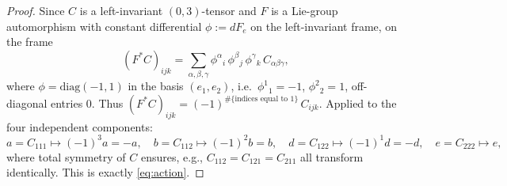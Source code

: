\documentclass{amsart}
\theoremstyle{definition}
\theoremstyle{remark}
\begin{document}
\begin{proof}
Since $C$ is a left-invariant $(0,3)$-tensor and $F$ is a Lie-group automorphism with constant differential
$\phi:=dF_e$ on the left-invariant frame, on the frame
\[
(F^{*}C)_{ijk}=\sum_{\alpha,\beta,\gamma}\phi^{\alpha}{}_{i}\,\phi^{\beta}{}_{j}\,\phi^{\gamma}{}_{k}\,C_{\alpha\beta\gamma},
\]
where $\phi=\mathrm{diag}(-1,1)$ in the basis $(e_1,e_2)$, i.e.\ $\phi^1{}_1=-1$, $\phi^2{}_2=1$, off-diagonal
entries $0$. Thus $(F^{*}C)_{ijk}=(-1)^{\#\{\text{indices equal to }1\}}\,C_{ijk}$. Applied to the four
independent components:
\[
a=C_{111}\mapsto(-1)^3a=-a,\quad
b=C_{112}\mapsto(-1)^2b=b,\quad
d=C_{122}\mapsto(-1)^1d=-d,\quad
e=C_{222}\mapsto e,
\]
where total symmetry of $C$ ensures, e.g., $C_{112}=C_{121}=C_{211}$ all transform identically. This is exactly
\eqref{eq:action}.
\end{proof}
\end{document}
